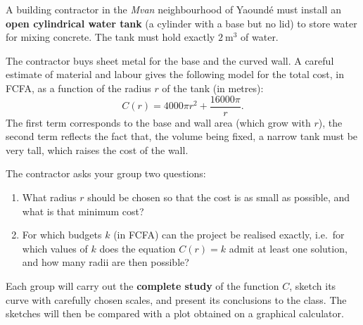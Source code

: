 \documentclass[11pt]{article}
\newcounter{popsec}
\newcounter{popsub}
\newcommand{\courssub}[1]{%
  \stepcounter{popsub}%
  \par\vspace{9pt}\noindent{\popxbold\fontsize{11.5}{13}\selectfont\color{popink}{\color{poporange}\thepopsec.\thepopsub}\hspace{6pt}#1}\par\nopagebreak\vspace{4pt}
}
\begin{document}
\begin{experience}
A building contractor in the \emph{Mvan} neighbourhood of Yaoundé must install an \textbf{open cylindrical water tank} (a cylinder with a base but no lid) to store water for mixing concrete. The tank must hold exactly $2\ \mathrm{m^3}$ of water.

The contractor buys sheet metal for the base and the curved wall. A careful estimate of material and labour gives the following model for the total cost, in FCFA, as a function of the radius $r$ of the tank (in metres):
\[
C(r) = 4000\pi r^{2} + \frac{16000\pi}{r}.
\]
The first term corresponds to the base and wall area (which grow with $r$), the second term reflects the fact that, the volume being fixed, a narrow tank must be very tall, which raises the cost of the wall.

The contractor asks your group two questions:
\begin{enumerate}
\item What radius $r$ should be chosen so that the cost is as small as possible, and what is that minimum cost?
\item For which budgets $k$ (in FCFA) can the project be realised exactly, i.e.\ for which values of $k$ does the equation $C(r) = k$ admit at least one solution, and how many radii are then possible?
\end{enumerate}
Each group will carry out the \textbf{complete study} of the function $C$, sketch its curve with carefully chosen scales, and present its conclusions to the class. The sketches will then be compared with a plot obtained on a graphical calculator.
\end{experience}

\courssub{Tasks}
\end{document}
